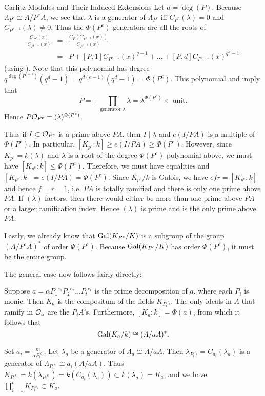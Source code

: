 \documentclass[12pt]{article}
\begin{document}
\begin{section}{Carlitz Modules and Their Induced Extensions}
Let $d = \deg(P)$.  Because $\Lambda_{P^e} \cong A/P^eA$, we see that
$\lambda$ is a generator of $\Lambda_{P^e}$ iff $C_{P^e}(\lambda) = 0$
and $C_{P^{e-1}}(\lambda) \neq 0$.  Thus the $\Phi(P^e)$ generators are
all the roots of
\begin{eqnarray*}
\frac{C_{P^e}(x)}{C_{P^{e-1}}(x)} & = &
\frac{C_P(C_{P^{e-1}}(x))}{C_{P^{e-1}}(x)} \\
& = & P + [P,1]C_{P^{e-1}}(x)^{q-1} + \ldots +
[P,d]C_{P^{e-1}}(x)^{q^d-1}
\end{eqnarray*}
(using ).  Note that this polynomial has degree
$q^{\deg(P^{e-1})}(q^d-1) = q^{d(e-1)}(q^d-1) = \Phi(P^e)$.  This
polynomial and  imply that
$$P = \pm \prod_{\text{generator }\lambda} \lambda 
= \lambda^{\Phi(P^e)} \times \text{ unit}.$$
Hence $P{\mathcal O}_{P^e} = (\lambda)^{\Phi(P^e)}$.

Thus if $I \subset {\mathcal O}_{P^e}$ is a prime above $PA$, then $I\mid\lambda$
and $e(I/PA)$ is a multiple of $\Phi(P^e)$.  In particular, $[K_{p^e}:k]
\geq e(I/PA) \geq \Phi(P^e)$.  However, since $K_{p^e} = k(\lambda)$ and
$\lambda$ is a root of the degree-$\Phi(P^e)$ polynomial above, we must
have $[K_{p^e}:k] \leq \Phi(P^e)$.  Therefore, we must have equalities and
$[K_{p^e}:k] = e(I/PA) = \Phi(P^e)$.  Since $K_{p^e}/k$ is Galois, we
have $efr = [K_{p^e}:k]$ and hence $f = r = 1$, i.e. $PA$ is totally
ramified and there is only one prime above $PA$.  If $(\lambda)$ factors,
then there would either be more than one prime above $PA$ or a larger
ramification index.  Hence $(\lambda)$ is prime and is the only prime
above $PA$.

Lastly, we already know that $\operatorname{Gal}(K_{P^e}/K)$ is a subgroup of the group
$(A/P^eA)^*$ of order $\Phi(P^e)$.  Because $\operatorname{Gal}(K_{P^e}/K)$ has order
$\Phi(P^e)$, it must be the entire group.
\hamlos

The general case now follows fairly directly:
\begin{theorem}
Suppose $a = \alpha{P_1}^{e_1}{P_2}^{e_2}\ldots{P_t}^{e_t}$ is the prime
decomposition of $a$, where each $P_i$ is monic.  Then $K_a$ is the
compositum of the fields $K_{{P_i}^{e_i}}$.  The only ideals in $A$ that
ramify in ${\mathcal O}_a$ are the $P_iA$'s.  Furthermore, $[K_a:k] = \Phi(a)$,
from which it follows that $$\operatorname{Gal}(K_a/k) \cong (A/aA)^*.$$
\end{theorem}

\pf
Set $a_i = \frac{m}{\alpha{P_i}^{e_i}}$.  Let $\lambda_a$ be a generator
of $\Lambda_a \cong A/aA$.  Then $\lambda_{{P_i}^{e_i}} =
C_{a_i}(\lambda_a)$ is a generator of $\Lambda_{{P_i}^{e_i}} \cong
a_i(A/aA)$.  Thus $K_{{P_i}^{e_i}} = k(\lambda_{{P_i}^{e_i}}) =
k(C_{a_i}(\lambda_a)) \subset k(\lambda_a) = K_a$, and we have
$\prod^t_{i=1} K_{{P_i}^{e_i}} \subset K_a$.


\end{section}
\end{document}
